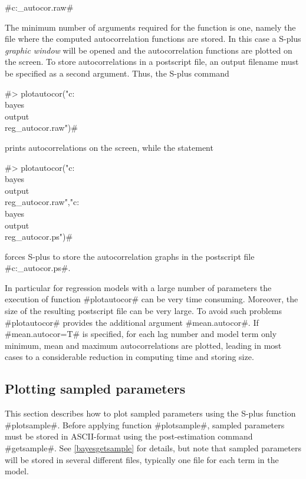#c:\bayes\output\reg_autocor.raw#

The minimum number of arguments required for the function is one,
namely the file where the computed autocorrelation functions are
stored. In this case a S-plus {\em graphic window} will be opened
and the autocorrelation functions are plotted on the screen. To
store autocorrelations in a postscript file, an output filename
must be specified as a second argument. Thus, the S-plus command

#> plotautocor("c:\\bayes\\output\\reg_autocor.raw")#

prints autocorrelations on the screen, while the statement

 #> plotautocor("c:\\bayes\\output\\reg_autocor.raw","c:\\bayes\\output\\reg_autocor.ps")#

forces S-plus to store the autocorrelation graphs in the
postscript file #c:\bayes\output\reg_autocor.ps#.

In particular for regression models with a large number of
parameters the execution of function #plotautocor# can be very
time consuming. Moreover, the size of the resulting postscript
file can be very large. To avoid such problems #plotautocor#
provides the additional argument #mean.autocor#. If
#mean.autocor=T# is specified, for each lag number and model term
only minimum, mean and maximum autocorrelations are plotted,
leading in most cases to a considerable reduction in computing
time and storing size.

\subsection{Plotting sampled parameters} \label{splusplotsample}
 

This section describes how to plot sampled parameters using the
S-plus function #plotsample#. Before applying function
#plotsample#, sampled parameters must be stored in ASCII-format
using the post-estimation command #getsample#. See
\autoref{bayesgetsample} for details, but note that sampled
parameters will be stored in several different files, typically
one file for each term in the model.

